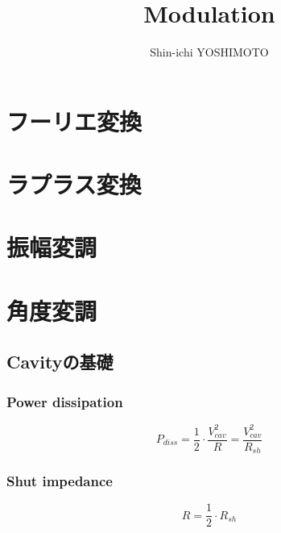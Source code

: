 \documentclass[book]{jlreq}
\begin{document}
\title{Modulation}
\author{Shin-ichi YOSHIMOTO}
\maketitle
\tableofcontents

\chapter{フーリエ変換}
\chapter{ラプラス変換}
\chapter{振幅変調}
\chapter{角度変調}


\section{Cavityの基礎}
\subsection{Power dissipation}
\begin{equation}
    P_{diss} = \frac{1}{2} \cdot \frac{V_{cav}^2}{R} = \frac{V_{cav}^2}{R_{sh}}
\end{equation}

\subsection{Shut impedance}
\begin{equation}
    R = \frac{1}{2}\cdot R_{sh}
\end{equation}
\end{document}
